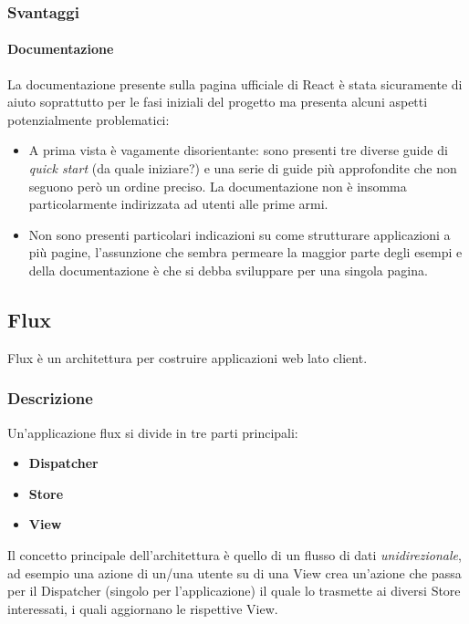 \subsubsection{Svantaggi}

\paragraph{Documentazione}
La documentazione presente sulla pagina ufficiale di React è stata sicuramente di aiuto
soprattutto per le fasi iniziali del progetto ma presenta alcuni aspetti potenzialmente
problematici:

\begin{itemize}
\item A prima vista è vagamente disorientante: sono presenti tre diverse guide di
\textit{quick start} (da quale iniziare?) e una serie di guide più approfondite che
non seguono però un ordine preciso. La documentazione non è insomma particolarmente
indirizzata ad utenti alle prime armi.
\item Non sono presenti particolari indicazioni su come strutturare applicazioni
a più pagine, l'assunzione che sembra permeare la maggior parte degli esempi e della
documentazione è che si debba sviluppare per una singola pagina.
\end{itemize}

\subsection{Flux}\label{flux}

Flux è un architettura per costruire applicazioni web lato client.

\subsubsection{Descrizione}
Un'applicazione flux si divide in tre parti principali:

\begin{itemize}
\item \textbf{Dispatcher}
\item \textbf{Store}
\item \textbf{View}
\end{itemize}

Il concetto principale dell'architettura è quello di un flusso di dati \textit{unidirezionale},
ad esempio una azione di un/una utente su di una View crea un'azione che passa per il Dispatcher
(singolo per l'applicazione) il quale lo trasmette ai diversi Store interessati, i quali
aggiornano le rispettive View.

